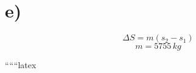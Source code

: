 

\section*{e)}
\begin{equation*}
\Delta S = m(s_2 - s_1)
\end{equation*}
\begin{equation*}
m = 5755 \, kg
\end{equation*}

``````latex